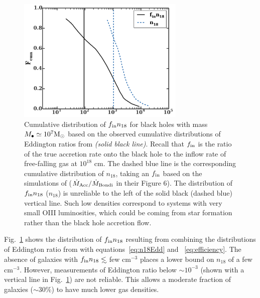 \documentclass[usenatbib,fleqn]{mnras}
\newcommand\lsim{\mathrel{\rlap{\lower4pt\hbox{\hskip1pt$\sim$}}
    \raise1pt\hbox{$<$}}}
\newcommand{\Mbh}[1][]{M_{\bullet#1}}
\newcommand{\Msun}{{\rm M_\odot}}
\begin{document}
\begin{figure}
\includegraphics[width=8cm]{fcum_n18.pdf}
\caption{\label{fig:n18Cum} Cumulative distribution of $f_{\rm in}
  n_{18}$ for black holes with mass $\Mbh\simeq 10^{7} \Msun$ based on
  the observed cumulative distributions of Eddington ratios from
  \citet{Kauffmann&Heckman2009} {\it (solid black line)}. Recall that
  $f_{\rm in}$ is the ratio of the true accretion rate onto the black
  hole to the inflow rate of free-falling gas at $10^{18}$ cm.  The
  dashed blue line is the corresponding cumulative distribution of
  $n_{18}$, taking an $f_{\rm in}$ based on the simulations of
  \citet{Li+2013} ($\dot{M}_{\rm Acc}/\dot{M}_{\rm Bondi}$ in their
  Figure 6). The distribution of $f_{\rm in} n_{18}$ ($n_{18}$) is
  unreliable to the left of the solid black (dashed blue) vertical
  line. Such low densities correspond to systems with very small OIII
  luminosities, which could be coming from star formation rather than
  the black hole accretion flow.}
\end{figure}


Fig.~\ref{fig:n18Cum} shows the distribution of $f_{\rm in} n_{18}$
resulting from combining the distributions of Eddington ratio from
\citet{Kauffmann&Heckman2009} with equations~\eqref{eq:n18Edd} and
~\eqref{eq:efficiency}.  The absence of galaxies with $f_{\rm in
}n_{18} \lsim$ few cm$^{-3}$ places a lower bound on $n_{18}$ of a few
cm$^{-3}$.  However, measurements of Eddington ratio below $\sim
10^{-3}$ (shown with a vertical line in Fig.~\ref{fig:n18Cum}) are not
reliable. This allows a moderate fraction of galaxies ($\sim 30\%$) to
have much lower gas densities.
\end{document}
